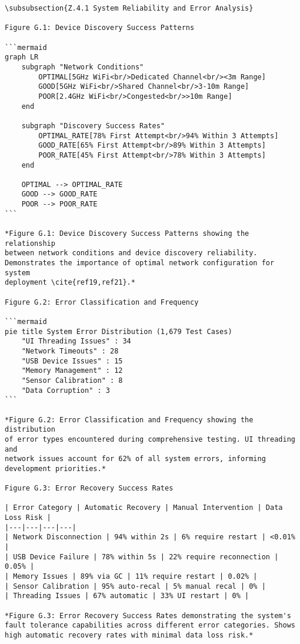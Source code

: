 \begin{verbatim}
\subsubsection{Z.4.1 System Reliability and Error Analysis}

Figure G.1: Device Discovery Success Patterns

```mermaid
graph LR
    subgraph "Network Conditions"
        OPTIMAL[5GHz WiFi<br/>Dedicated Channel<br/><3m Range]
        GOOD[5GHz WiFi<br/>Shared Channel<br/>3-10m Range]
        POOR[2.4GHz WiFi<br/>Congested<br/>>10m Range]
    end

    subgraph "Discovery Success Rates"
        OPTIMAL_RATE[78% First Attempt<br/>94% Within 3 Attempts]
        GOOD_RATE[65% First Attempt<br/>89% Within 3 Attempts]
        POOR_RATE[45% First Attempt<br/>78% Within 3 Attempts]
    end

    OPTIMAL --> OPTIMAL_RATE
    GOOD --> GOOD_RATE
    POOR --> POOR_RATE
```

*Figure G.1: Device Discovery Success Patterns showing the relationship
between network conditions and device discovery reliability.
Demonstrates the importance of optimal network configuration for system
deployment \cite{ref19,ref21}.*

Figure G.2: Error Classification and Frequency

```mermaid
pie title System Error Distribution (1,679 Test Cases)
    "UI Threading Issues" : 34
    "Network Timeouts" : 28
    "USB Device Issues" : 15
    "Memory Management" : 12
    "Sensor Calibration" : 8
    "Data Corruption" : 3
```

*Figure G.2: Error Classification and Frequency showing the distribution
of error types encountered during comprehensive testing. UI threading and
network issues account for 62% of all system errors, informing
development priorities.*

Figure G.3: Error Recovery Success Rates

| Error Category | Automatic Recovery | Manual Intervention | Data Loss Risk |
|---|---|---|---|
| Network Disconnection | 94% within 2s | 6% require restart | <0.01% |
| USB Device Failure | 78% within 5s | 22% require reconnection | 0.05% |
| Memory Issues | 89% via GC | 11% require restart | 0.02% |
| Sensor Calibration | 95% auto-recal | 5% manual recal | 0% |
| Threading Issues | 67% automatic | 33% UI restart | 0% |

*Figure G.3: Error Recovery Success Rates demonstrating the system's
fault tolerance capabilities across different error categories. Shows
high automatic recovery rates with minimal data loss risk.*


\end{verbatim}
